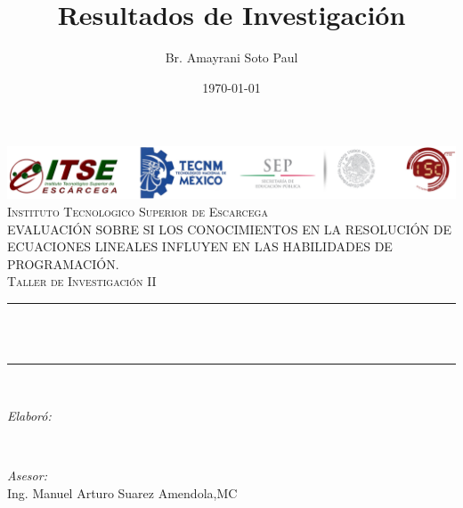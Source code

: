 \documentclass[12pt] {report}
\title{Resultados de Investigación}
\author{Br. Amayrani Soto Paul}
\date{\today}
\makeatletter
\let\thetitle\@title
\let\theauthor\@author
\let\thedate\@date
\makeatother
\begin{document}

\begin{titlepage}
	\centering
    \vspace*{0.2 cm}
    \includegraphics[scale = 0.60]{log1.png}\\[3.0 cm]
          \textsc{\LARGE Instituto Tecnologico Superior de Escarcega}\\[2.0 cm]	%
	\textsc{\Large EVALUACIÓN SOBRE SI LOS CONOCIMIENTOS EN LA RESOLUCIÓN DE ECUACIONES LINEALES INFLUYEN EN LAS HABILIDADES DE PROGRAMACIÓN. }\\[0.5 cm]				
	\textsc{\large Taller de Investigación II}\\[0.5 cm]				
	\rule{\linewidth}{0.2 mm} \\[0.4 cm]
	{ \huge \bfseries \thetitle}\\
    
	\rule{\linewidth}{0.2 mm} \\[1.5 cm]
	
	\begin{minipage}{0.4\textwidth}
		\begin{flushleft} \large
			\emph{Elaboró:}\\
			\theauthor
			\end{flushleft}
			\end{minipage}~
			\begin{minipage}{0.4\textwidth}
			\begin{flushright} \large
			\emph{Asesor:} \\
			Ing. Manuel Arturo Suarez Amendola,MC	
           
		\end{flushright}
        
	\end{minipage}\\[2 cm]
	
	{\large \thedate}\\[5 cm]
 
	\vfill
	
\end{titlepage}


\tableofcontents
\pagebreak
\end{document}
